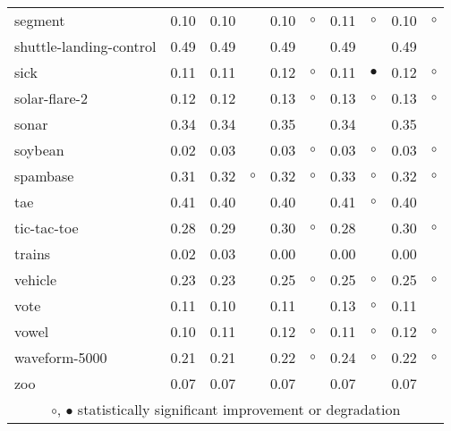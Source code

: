 {\begin{longtable}{lrr@{\hspace{0.1cm}}cr@{\hspace{0.1cm}}cr@{\hspace{0.1cm}}cr@{\hspace{0.1cm}}c}
segment & 0.10 & 0.10 &           & 0.10 &   $\circ$ & 0.11 &   $\circ$ & 0.10 &   $\circ$\\
shuttle-landing-control & 0.49 & 0.49 &           & 0.49 &           & 0.49 &           & 0.49 &          \\
sick & 0.11 & 0.11 &           & 0.12 &   $\circ$ & 0.11 & $\bullet$ & 0.12 &   $\circ$\\
solar-flare-2 & 0.12 & 0.12 &           & 0.13 &   $\circ$ & 0.13 &   $\circ$ & 0.13 &   $\circ$\\
sonar & 0.34 & 0.34 &           & 0.35 &           & 0.34 &           & 0.35 &          \\
soybean & 0.02 & 0.03 &           & 0.03 &   $\circ$ & 0.03 &   $\circ$ & 0.03 &   $\circ$\\
spambase & 0.31 & 0.32 &   $\circ$ & 0.32 &   $\circ$ & 0.33 &   $\circ$ & 0.32 &   $\circ$\\
tae & 0.41 & 0.40 &           & 0.40 &           & 0.41 &   $\circ$ & 0.40 &          \\
tic-tac-toe & 0.28 & 0.29 &           & 0.30 &   $\circ$ & 0.28 &           & 0.30 &   $\circ$\\
trains & 0.02 & 0.03 &           & 0.00 &           & 0.00 &           & 0.00 &          \\
vehicle & 0.23 & 0.23 &           & 0.25 &   $\circ$ & 0.25 &   $\circ$ & 0.25 &   $\circ$\\
vote & 0.11 & 0.10 &           & 0.11 &           & 0.13 &   $\circ$ & 0.11 &          \\
vowel & 0.10 & 0.11 &           & 0.12 &   $\circ$ & 0.11 &   $\circ$ & 0.12 &   $\circ$\\
waveform-5000 & 0.21 & 0.21 &           & 0.22 &   $\circ$ & 0.24 &   $\circ$ & 0.22 &   $\circ$\\
zoo & 0.07 & 0.07 &           & 0.07 &           & 0.07 &           & 0.07 &          \\
\hline
\multicolumn{10}{c}{$\circ$, $\bullet$ statistically significant improvement or degradation}\\
\end{longtable} \footnotesize \par}
